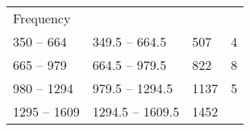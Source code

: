 \documentclass[]{book}
\begin{document}
\begin{longtable}[]{@{}llll@{}}
\begin{minipage}[t]{0.15\columnwidth}
Frequency\strut
\end{minipage}\tabularnewline
\begin{minipage}[t]{0.18\columnwidth}\raggedright
350 -- 664\strut
\end{minipage} & \begin{minipage}[t]{0.23\columnwidth}\raggedright
349.5 -- 664.5\strut
\end{minipage} & \begin{minipage}[t]{0.14\columnwidth}\raggedright
507\strut
\end{minipage} & \begin{minipage}[t]{0.15\columnwidth}\raggedright
4\strut
\end{minipage}\tabularnewline
\begin{minipage}[t]{0.18\columnwidth}\raggedright
665 -- 979\strut
\end{minipage} & \begin{minipage}[t]{0.23\columnwidth}\raggedright
664.5 -- 979.5\strut
\end{minipage} & \begin{minipage}[t]{0.14\columnwidth}\raggedright
822\strut
\end{minipage} & \begin{minipage}[t]{0.15\columnwidth}\raggedright
8\strut
\end{minipage}\tabularnewline
\begin{minipage}[t]{0.18\columnwidth}\raggedright
980 -- 1294\strut
\end{minipage} & \begin{minipage}[t]{0.23\columnwidth}\raggedright
979.5 -- 1294.5\strut
\end{minipage} & \begin{minipage}[t]{0.14\columnwidth}\raggedright
1137\strut
\end{minipage} & \begin{minipage}[t]{0.15\columnwidth}\raggedright
5\strut
\end{minipage}\tabularnewline
\begin{minipage}[t]{0.18\columnwidth}\raggedright
1295 -- 1609\strut
\end{minipage} & \begin{minipage}[t]{0.23\columnwidth}\raggedright
1294.5 -- 1609.5\strut
\end{minipage} & \begin{minipage}[t]{0.14\columnwidth}\raggedright
1452\strut
\end{minipage} & \begin{minipage}[t]{0.15\columnwidth}\raggedright

\end{minipage}
\end{longtable}
\end{document}
